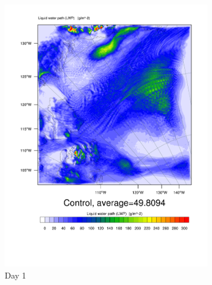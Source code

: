 \begin{figure}
    \centering
    \begin{subfigure}{0.48\textwidth}
        \centering
        \includegraphics[width=\textwidth]{results/LWP_Day1.pdf}
        \caption{Day 1}
        \label{subfig:LWPr1Day1}
    \end{subfigure}
    \begin{subfigure}{0.48\textwidth}
        \centering

\end{subfigure}
\end{figure}
